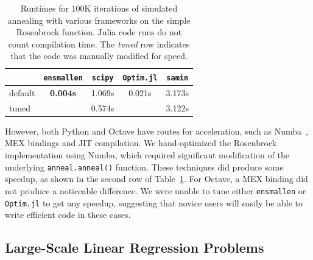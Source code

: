 \begin{table}[t!]
\begin{center}
\begin{tabular}{lcccc}
\toprule
 & {\tt ensmallen} & {\tt scipy} & {\tt Optim.jl} & {\tt samin} \\
\midrule
default & {\bf 0.004s} & 1.069s & 0.021s & 3.173s \\
tuned & & 0.574s & & 3.122s \\
\bottomrule
\end{tabular}
\end{center}
\vspace*{-0.5em}
\caption{Runtimes for $100$K iterations of simulated annealing with various
frameworks on the simple Rosenbrock function.  Julia code runs do not count
compilation time.  The {\it tuned} row indicates that the code was manually
modified for speed.}
\label{tab:rosenbrock_results}
\end{table}

However, both Python and Octave have routes for acceleration,
such as Numba~\cite{lam2015numba}, MEX bindings and JIT compilation.
We hand-optimized the Rosenbrock implementation using Numba,
which required significant modification of the
underlying \texttt{anneal.anneal()} function.
These techniques did produce some speedup,
as shown in the second row of Table~\ref{tab:rosenbrock_results}.
For Octave, a MEX binding did not produce a noticeable difference.
We were unable to tune either \texttt{ensmallen} or
\texttt{Optim.jl} to get any speedup,
suggesting that novice users will easily be able
to write efficient code in these cases.

\subsection{Large-Scale Linear Regression Problems}

